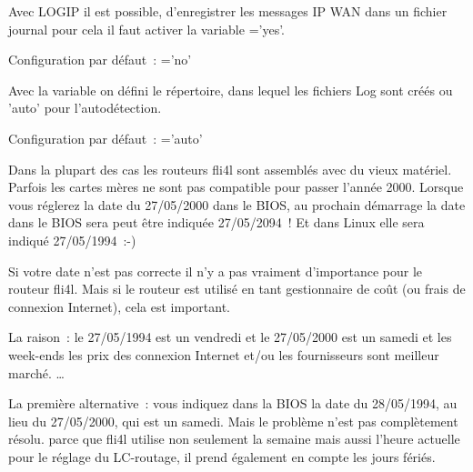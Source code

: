 
  Avec LOGIP il est possible, d'enregistrer les messages IP WAN dans un fichier
  journal pour cela il faut activer la variable ='yes'.

  Configuration par défaut~: ='no'

\begin{description}

  Avec la variable  on défini le répertoire, dans
  lequel les fichiers Log sont créés ou 'auto' pour l'autodétection.

  Configuration par défaut~: ='auto'
\end{description}



  Dans la plupart des cas les routeurs fli4l sont assemblés avec du
  vieux matériel. Parfois les cartes mères ne sont pas compatible pour
  passer l'année 2000. Lorsque vous réglerez la date du 27/05/2000
  dans le BIOS, au prochain démarrage la date dans le BIOS sera peut être
  indiquée 27/05/2094~! Et dans Linux elle sera indiqué 27/05/1994~:-)

  Si votre date n'est pas correcte il n'y a pas vraiment d'importance pour
  le routeur fli4l. Mais si le routeur est utilisé en tant gestionnaire
  de coût (ou frais de connexion Internet), cela est important.

  La raison~: le 27/05/1994 est un vendredi et le 27/05/2000 est un samedi
  et les week-ends les prix des connexion Internet et/ou les fournisseurs sont
  meilleur marché. \ldots

  La première alternative~: vous indiquez dans la BIOS la date du 28/05/1994,
  au lieu du 27/05/2000, qui est un samedi. Mais le problème n'est pas
  complètement résolu. parce que fli4l utilise non seulement la semaine mais
  aussi l'heure actuelle pour le réglage du LC-routage, il prend également en
  compte les jours fériés.

